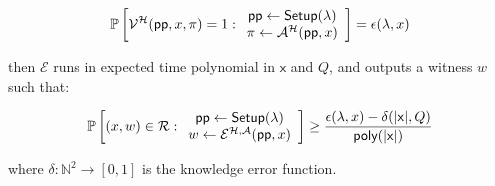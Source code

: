 \begin{definition}
\begin{itemize}
$$\mathbb{P}\left[\mathcal{V}^{\mathcal{H}}(\textsf{pp}, x, \pi) = 1 : \begin{array}{c} \textsf{pp} \gets \textsf{{Setup}}(\lambda) \\ \pi \gets \mathcal{A}^{\mathcal{H}}(\textsf{pp}, x) \end{array}\right] = \epsilon(\lambda, x) $$

then $\mathcal{E}$ runs in expected time polynomial in $\mathsf{x}$ and $Q$, and outputs a witness $w$ such that: 

$$\mathbb{P}\left[(x, w) \in \mathcal{R} : \begin{array}{c} \textsf{pp} \gets \textsf{{Setup}}(\lambda) \\ w \gets \mathcal{E}^{\mathcal{H}, \mathcal{A}}(\textsf{pp}, x) \end{array}\right] \geq \frac{\epsilon(\lambda, x) - \delta(|\mathsf{x}|, Q)}{\textsf{poly}(|\mathsf{x}|)} $$

where $\delta: \mathbb{N}^2 \rightarrow [0,1]$ is the knowledge error function. 
\end{itemize} 

\end{definition} 
\fi 

